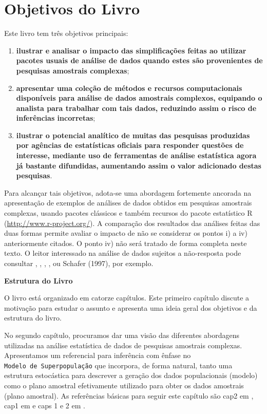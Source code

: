 \documentclass[]{book}
\theoremstyle{definition}
\theoremstyle{definition}
\theoremstyle{remark}
\begin{document}
\section{Objetivos do Livro}\label{objetivos-do-livro}

Este livro tem três objetivos principais:

\begin{enumerate}
\def\labelenumi{\arabic{enumi})}
\item
  \textbf{ilustrar e analisar o impacto das simplificações feitas ao
  utilizar pacotes usuais de análise de dados quando estes são
  provenientes de pesquisas amostrais complexas};
\item
  \textbf{apresentar uma coleção de métodos e recursos computacionais
  disponíveis para análise de dados amostrais complexos, equipando o
  analista para trabalhar com tais dados, reduzindo assim o risco de
  inferências incorretas};
\item
  \textbf{ilustrar o potencial analítico de muitas das pesquisas
  produzidas por agências de estatísticas oficiais para responder
  questões de interesse, mediante uso de ferramentas de análise
  estatística agora já bastante difundidas, aumentando assim o valor
  adicionado destas pesquisas}.
\end{enumerate}

Para alcançar tais objetivos, adota-se uma abordagem fortemente ancorada
na apresentação de exemplos de análises de dados obtidos em pesquisas
amostrais complexas, usando pacotes clássicos e também recursos do
pacote estatístico R (\url{http://www.r-project.org/}). A comparação dos
resultados das análises feitas das duas formas permite avaliar o impacto
de não se considerar os pontos i) a iv) anteriormente citados. O ponto
iv) não será tratado de forma completa neste texto. O leitor interessado
na análise de dados sujeitos a não-resposta pode consultar
\citep{kalton83a}, \citep{LR2002}, \citep{Rubin87}, \citep{SSW92}, ou
Schafer (1997), por exemplo.

\textbf{Estrutura do Livro}

O livro está organizado em catorze capítulos. Este primeiro capítulo
discute a motivação para estudar o assunto e apresenta uma ideia geral
dos objetivos e da estrutura do livro.

No segundo capítulo, procuramos dar uma visão das diferentes abordagens
utilizadas na análise estatística de dados de pesquisas amostrais
complexas. Apresentamos um referencial para inferência com ênfase no
\texttt{Modelo\ de\ Superpopulação} que incorpora, de forma natural,
tanto uma estrutura estocástica para descrever a geração dos dados
populacionais (modelo) como o plano amostral efetivamente utilizado para
obter os dados amostrais (plano amostral). As referências básicas para
seguir este capítulo são cap2 em \citep{Silva}, cap1 em \citep{SHS89} e
caps 1 e 2 em \citep{CHSK2003}.
\end{document}
